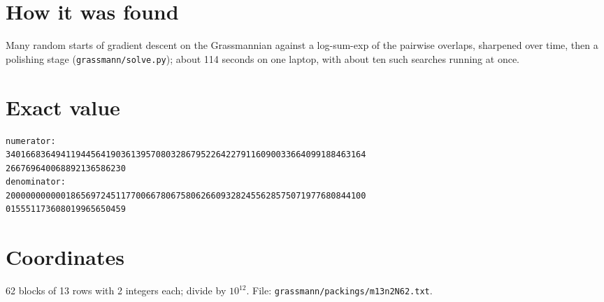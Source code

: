 \documentclass[11pt,a4paper]{article}
\begin{document}
\section{How it was found}
Many random starts of gradient descent on the Grassmannian against a log-sum-exp of the pairwise overlaps, sharpened over time, then a polishing stage (\texttt{grassmann/solve.py}); about 114 seconds on one laptop, with about ten such searches running at once.


\appendix
\section{Exact value}
{\small
\begin{verbatim}
numerator:
340166836494119445641903613957080328679522642279116090033664099188463164
266769640068892136586230
denominator:
200000000000186569724511770066780675806266093282455628575071977680844100
015551173608019965650459
\end{verbatim}}

\section{Coordinates}
62 blocks of 13 rows with 2 integers each; divide by $10^{12}$. File: \texttt{grassmann/packings/m13n2N62.txt}.
{\tiny
\begin{multicols}{4}
\end{multicols}}
\end{document}
